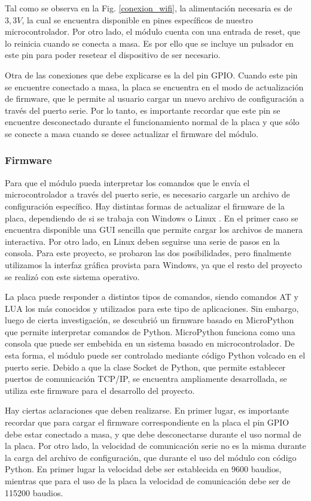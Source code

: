 \documentclass[conference,a4paper,9pt]{IEEEtran}
\begin{document}
Tal como se observa en la Fig. \ref{conexion_wifi}, la alimentación necesaria es de $3,3 V$, la cual se encuentra disponible en pines específicos de nuestro microcontrolador. Por otro lado, el módulo cuenta con una entrada de reset, que lo reinicia cuando se conecta a masa. Es por ello que se incluye un pulsador en este pin para poder resetear el dispositivo de ser necesario.

Otra de las conexiones que debe explicarse es la del pin GPIO. Cuando este pin se encuentre conectado a masa, la placa se encuentra en el modo de actualización de firmware, que le permite al usuario cargar un nuevo archivo de configuración a través del puerto serie. Por lo tanto, es importante recordar que este pin se encuentre desconectado durante el funcionamiento normal de la placa y que sólo se conecte a masa cuando se desee actualizar el firmware del módulo.

\subsubsection{Firmware}

Para que el módulo pueda interpretar los comandos que le envía el microcontrolador a través del puerto serie, es necesario cargarle un archivo de configuración específico. Hay distintas formas de actualizar el firmware de la placa, dependiendo de si se trabaja con Windows o Linux \cite{firmware}. En el primer caso se encuentra disponible una GUI sencilla que permite cargar los archivos de manera interactiva. Por otro lado, en Linux deben seguirse una serie de pasos en la consola. Para este proyecto, se probaron las dos posibilidades, pero finalmente utilizamos la interfaz gráfica provista para Windows, ya que el resto del proyecto se realizó con este sistema operativo.

La placa puede responder a distintos tipos de comandos, siendo comandos AT y LUA los más conocidos y utilizados para este tipo de aplicaciones. Sin embargo, luego de cierta investigación, se descubrió un firmware basado en MicroPython que permite interpretar comandos de Python. MicroPython funciona como una consola que puede ser embebida en un sistema basado en microcontrolador. De esta forma, el módulo puede ser controlado mediante código Python volcado en el puerto serie. Debido a que la clase Socket de Python, que permite establecer puertos de comunicación TCP/IP, se encuentra ampliamente desarrollada, se utiliza este firmware para el desarrollo del proyecto.

Hay ciertas aclaraciones que deben realizarse. En primer lugar, es importante recordar que para cargar el firmware correspondiente en la placa el pin GPIO debe estar conectado a masa, y que debe desconectarse durante el uso normal de la placa. Por otro lado, la velocidad de comunicación serie no es la misma durante la carga del archivo de configuración, que durante el uso del módulo con código Python. En primer lugar la velocidad debe ser establecida en 9600 baudios, mientras que para el uso de la placa la velocidad de comunicación debe ser de 115200 baudios.
\end{document}
